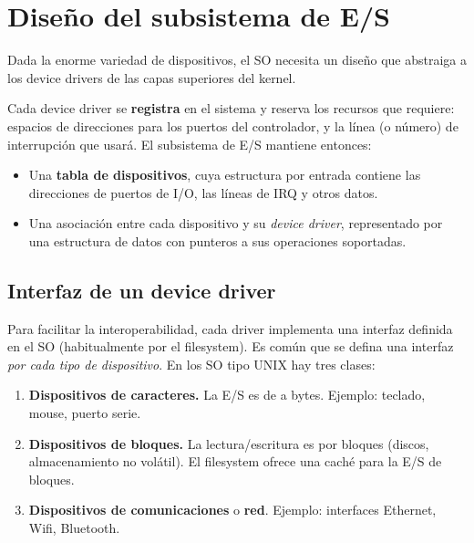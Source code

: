\documentclass[11pt,a4paper]{article}
\begin{document}
\section{Diseño del subsistema de E/S}

Dada la enorme variedad de dispositivos, el SO necesita un diseño que
abstraiga a los device drivers de las capas superiores del kernel.

Cada device driver se \textbf{registra} en el sistema y reserva los
recursos que requiere: espacios de direcciones para los puertos del
controlador, y la línea (o número) de interrupción que usará. El
subsistema de E/S mantiene entonces:

\begin{itemize}[leftmargin=*,nosep]
    \item Una \textbf{tabla de dispositivos}, cuya estructura por
        entrada contiene las direcciones de puertos de I/O, las
        líneas de IRQ y otros datos.
    \item Una asociación entre cada dispositivo y su \emph{device
        driver}, representado por una estructura de datos con punteros
        a sus operaciones soportadas.
\end{itemize}

\subsection{Interfaz de un device driver}

Para facilitar la interoperabilidad, cada driver implementa una interfaz
definida en el SO (habitualmente por el filesystem). Es común que se
defina una interfaz \emph{por cada tipo de dispositivo}. En los SO tipo
UNIX hay tres clases:

\begin{enumerate}[leftmargin=*]
    \item \textbf{Dispositivos de caracteres.} La E/S es de a bytes.
        Ejemplo: teclado, mouse, puerto serie.
    \item \textbf{Dispositivos de bloques.} La lectura/escritura es por
        bloques (discos, almacenamiento no volátil). El filesystem
        ofrece una caché para la E/S de bloques.
    \item \textbf{Dispositivos de comunicaciones} o \textbf{red}.
        Ejemplo: interfaces Ethernet, Wifi, Bluetooth.
\end{enumerate}
\end{document}
